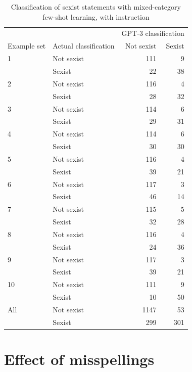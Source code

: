 \documentclass[12pt,]{article}
\begin{document}
\begin{table}[!h]

\caption{\label{tab:fewshotmixedinstruct-sexism}Classification of sexist statements with mixed-category few-shot learning, with instruction}
\centering
\fontsize{8}{10}\selectfont
\begin{tabular}[t]{llrr}
\toprule
\multicolumn{2}{c}{ } & \multicolumn{2}{c}{GPT-3 classification} \\
\cmidrule(l{3pt}r{3pt}){3-4}
Example set & Actual classification & Not sexist & Sexist\\
\midrule
1 & Not sexist & 111 & 9\\
 & Sexist & 22 & 38\\
\midrule
2 & Not sexist & 116 & 4\\
 & Sexist & 28 & 32\\
\midrule
3 & Not sexist & 114 & 6\\
 & Sexist & 29 & 31\\
\midrule
4 & Not sexist & 114 & 6\\
 & Sexist & 30 & 30\\
\midrule
5 & Not sexist & 116 & 4\\
 & Sexist & 39 & \vphantom{1} 21\\
\midrule
6 & Not sexist & 117 & 3\\
 & Sexist & 46 & 14\\
\midrule
7 & Not sexist & 115 & 5\\
 & Sexist & 32 & 28\\
\midrule
8 & Not sexist & 116 & 4\\
 & Sexist & 24 & 36\\
\midrule
9 & Not sexist & 117 & 3\\
 & Sexist & 39 & 21\\
\midrule
10 & Not sexist & 111 & 9\\
 & Sexist & 10 & 50\\
\midrule
All & Not sexist & 1147 & 53\\
 & Sexist & 299 & 301\\
\bottomrule
\end{tabular}
\end{table}

\newpage

\hypertarget{appendxc}{%
\section{Effect of misspellings}\label{appendxc}}
\end{document}
